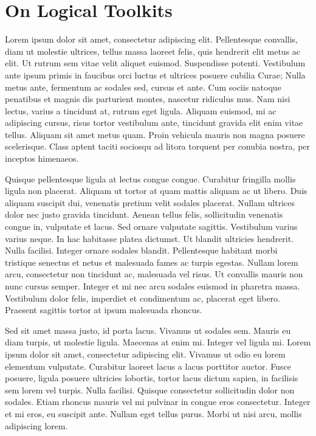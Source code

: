 \chapter{On Logical Toolkits}
Lorem ipsum dolor sit amet, consectetur adipiscing elit.
Pellentesque convallis, diam ut molestie ultrices, tellus massa laoreet felis, quis hendrerit elit metus ac elit.
Ut rutrum sem vitae velit aliquet euismod.
Suspendisse potenti.
Vestibulum ante ipsum primis in faucibus orci luctus et ultrices posuere cubilia Curae; Nulla metus ante, fermentum ac sodales sed, cursus et ante.
Cum sociis natoque penatibus et magnis dis parturient montes, nascetur ridiculus mus.
Nam nisi lectus, varius a tincidunt at, rutrum eget ligula.
Aliquam euismod, mi ac adipiscing cursus, risus tortor vestibulum ante, tincidunt gravida elit enim vitae tellus.
Aliquam sit amet metus quam.
Proin vehicula mauris non magna posuere scelerisque.
Class aptent taciti sociosqu ad litora torquent per conubia nostra, per inceptos himenaeos.

Quisque pellentesque ligula at lectus congue congue.
Curabitur fringilla mollis ligula non placerat.
Aliquam ut tortor at quam mattis aliquam ac ut libero.
Duis aliquam suscipit dui, venenatis pretium velit sodales placerat.
Nullam ultrices dolor nec justo gravida tincidunt.
Aenean tellus felis, sollicitudin venenatis congue in, vulputate et lacus.
Sed ornare vulputate sagittis.
Vestibulum varius varius neque.
In hac habitasse platea dictumst.
Ut blandit ultricies hendrerit.
Nulla facilisi.
Integer ornare sodales blandit.
Pellentesque habitant morbi tristique senectus et netus et malesuada fames ac turpis egestas.
Nullam lorem arcu, consectetur non tincidunt ac, malesuada vel risus.
Ut convallis mauris non nunc cursus semper.
Integer et mi nec arcu sodales euismod in pharetra massa.
Vestibulum dolor felis, imperdiet et condimentum ac, placerat eget libero.
Praesent sagittis tortor at ipsum malesuada rhoncus.

Sed sit amet massa justo, id porta lacus.
Vivamus ut sodales sem.
Mauris eu diam turpis, ut molestie ligula.
Maecenas at enim mi.
Integer vel ligula mi.
Lorem ipsum dolor sit amet, consectetur adipiscing elit.
Vivamus ut odio eu lorem elementum vulputate.
Curabitur laoreet lacus a lacus porttitor auctor.
Fusce posuere, ligula posuere ultricies lobortis, tortor lacus dictum sapien, in facilisis sem lorem vel turpis.
Nulla facilisi.
Quisque consectetur sollicitudin dolor non sodales.
Etiam rhoncus mauris vel mi pulvinar in congue eros consectetur.
Integer et mi eros, eu suscipit ante.
Nullam eget tellus purus.
Morbi ut nisi arcu, mollis adipiscing lorem.

